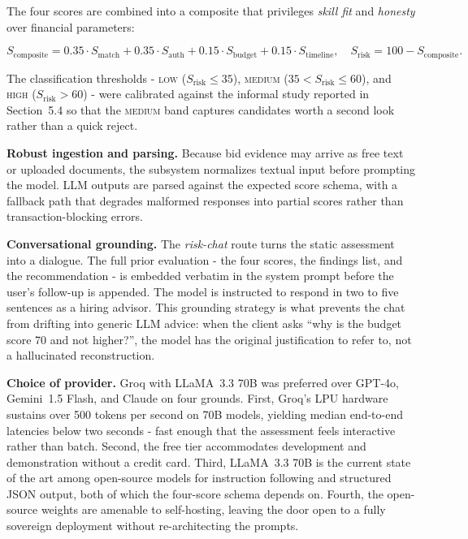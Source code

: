 The four scores are combined into a composite that privileges \emph{skill fit} and \emph{honesty} over financial parameters:

\begin{equation}
    S_{\text{composite}} = 0.35 \cdot S_{\text{match}} + 0.35 \cdot S_{\text{auth}} + 0.15 \cdot S_{\text{budget}} + 0.15 \cdot S_{\text{timeline}}, \quad S_{\text{risk}} = 100 - S_{\text{composite}}.
\end{equation}

The classification thresholds - \textsc{low} ($S_{\text{risk}} \leq 35$), \textsc{medium} ($35 < S_{\text{risk}} \leq 60$), and \textsc{high} ($S_{\text{risk}} > 60$) - were calibrated against the informal study reported in Section~5.4 so that the \textsc{medium} band captures candidates worth a second look rather than a quick reject.

\textbf{Robust ingestion and parsing.} Because bid evidence may arrive as free text or uploaded documents, the subsystem normalizes textual input before prompting the model. LLM outputs are parsed against the expected score schema, with a fallback path that degrades malformed responses into partial scores rather than transaction-blocking errors.

\textbf{Conversational grounding.} The \emph{risk-chat} route turns the static assessment into a dialogue. The full prior evaluation - the four scores, the findings list, and the recommendation - is embedded verbatim in the system prompt before the user's follow-up is appended. The model is instructed to respond in two to five sentences as a hiring advisor. This grounding strategy is what prevents the chat from drifting into generic LLM advice: when the client asks ``why is the budget score 70 and not higher?'', the model has the original justification to refer to, not a hallucinated reconstruction.

\textbf{Choice of provider.} Groq with LLaMA~3.3 70B was preferred over GPT-4o, Gemini~1.5 Flash, and Claude on four grounds. First, Groq's LPU hardware sustains over 500 tokens per second on 70B models, yielding median end-to-end latencies below two seconds - fast enough that the assessment feels interactive rather than batch. Second, the free tier accommodates development and demonstration without a credit card. Third, LLaMA~3.3 70B is the current state of the art among open-source models for instruction following and structured JSON output, both of which the four-score schema depends on. Fourth, the open-source weights are amenable to self-hosting, leaving the door open to a fully sovereign deployment without re-architecting the prompts.

